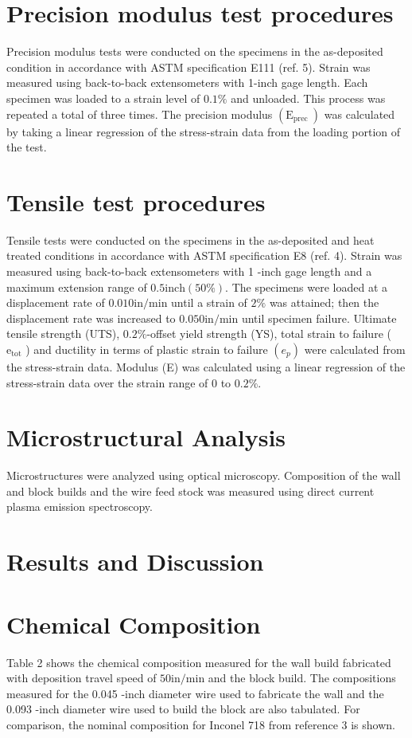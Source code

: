 \documentclass[10pt]{article}
\begin{document}
\section*{Precision modulus test procedures}
Precision modulus tests were conducted on the specimens in the as-deposited condition in accordance with ASTM specification E111 (ref. 5). Strain was measured using back-to-back extensometers with 1-inch gage length. Each specimen was loaded to a strain level of $0.1 \%$ and unloaded. This process was repeated a total of three times. The precision modulus $\left(\mathrm{E}_{\text {prec }}\right)$ was calculated by taking a linear regression of the stress-strain data from the loading portion of the test.

\section*{Tensile test procedures}
Tensile tests were conducted on the specimens in the as-deposited and heat treated conditions in accordance with ASTM specification E8 (ref. 4). Strain was measured using back-to-back extensometers with 1 -inch gage length and a maximum extension range of $0.5 \mathrm{inch}(50 \%)$. The specimens were loaded at a displacement rate of $0.010 \mathrm{in} / \mathrm{min}$ until a strain of $2 \%$ was attained; then the displacement rate was increased to $0.050 \mathrm{in} / \mathrm{min}$ until specimen failure. Ultimate tensile strength (UTS), $0.2 \%$-offset yield strength (YS), total strain to failure ( $\mathrm{e}_{\mathrm{tot}}$ ) and ductility in terms of plastic strain to failure $\left(e_{p}\right)$ were calculated from the stress-strain data. Modulus (E) was calculated using a linear regression of the stress-strain data over the strain range of 0 to $0.2 \%$.

\section*{Microstructural Analysis}
Microstructures were analyzed using optical microscopy. Composition of the wall and block builds and the wire feed stock was measured using direct current plasma emission spectroscopy.

\section*{Results and Discussion}
\section*{Chemical Composition}
Table 2 shows the chemical composition measured for the wall build fabricated with deposition travel speed of $50 \mathrm{in} / \mathrm{min}$ and the block build. The compositions measured for the 0.045 -inch diameter wire used to fabricate the wall and the 0.093 -inch diameter wire used to build the block are also tabulated. For comparison, the nominal composition for Inconel 718 from reference 3 is shown.
\end{document}
